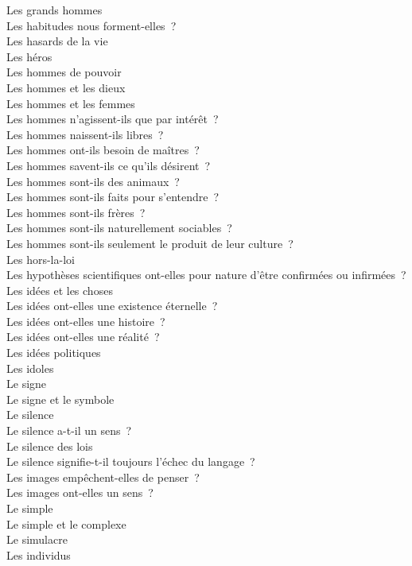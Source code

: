 \documentclass[a4paper,12pt]{article}
\begin{document}
Les grands hommes \\
Les habitudes nous forment-elles ? \\
Les hasards de la vie \\
Les héros \\
Les hommes de pouvoir \\
Les hommes et les dieux \\
Les hommes et les femmes \\
Les hommes n'agissent-ils que par intérêt ? \\
Les hommes naissent-ils libres ? \\
Les hommes ont-ils besoin de maîtres ? \\
Les hommes savent-ils ce qu'ils désirent ? \\
Les hommes sont-ils des animaux ? \\
Les hommes sont-ils faits pour s'entendre ? \\
Les hommes sont-ils frères ? \\
Les hommes sont-ils naturellement sociables ? \\
Les hommes sont-ils seulement le produit de leur culture ? \\
Les hors-la-loi \\
Les hypothèses scientifiques ont-elles pour nature d'être confirmées ou infirmées ? \\
Les idées et les choses \\
Les idées ont-elles une existence éternelle ? \\
Les idées ont-elles une histoire ? \\
Les idées ont-elles une réalité ? \\
Les idées politiques \\
Les idoles \\
Le signe \\
Le signe et le symbole \\
Le silence \\
Le silence a-t-il un sens ? \\
Le silence des lois \\
Le silence signifie-t-il toujours l'échec du langage ? \\
Les images empêchent-elles de penser ? \\
Les images ont-elles un sens ? \\
Le simple \\
Le simple et le complexe \\
Le simulacre \\
Les individus \\
\end{document}

